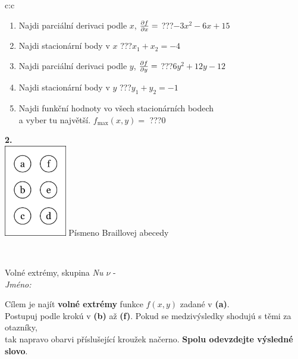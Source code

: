 \documentclass[10pt]{report}
\begin{document}
\begin{tabular}{c:c}
\begin{minipage}[c][104.5mm][t]{0.5\linewidth}
\begin{center}
\begin{minipage}{0.79\linewidth}
\begin{center}
\begin{varwidth}{\linewidth}
\begin{enumerate}
\item Najdi parciální derivaci podle $x$, $\pdv{f}{x}=$\quad \dotfill\; ???\;\dotfill \quad $-3x^2-6x+15$
\item Najdi stacionární body v $x$\quad \dotfill\; ???\;\dotfill \quad $x_1+x_2=-4$
\item Najdi parciální derivaci podle $y$, $\pdv{f}{y}=$\quad \dotfill\; ???\;\dotfill \quad $6y^2+12y-12$
\item Najdi stacionární body v $y$\quad \dotfill\; ???\;\dotfill \quad $y_1+y_2=-1$
\item Najdi funkční hodnoty vo všech stacionárních bodech \\ \phantom{xxxxxx} a vyber tu najvětší. $f_{\text{max}}(x,y)=$\quad \dotfill\; ???\;\dotfill \quad $0$
\end{enumerate}
\end{varwidth}
\end{center}
\end{minipage}
\begin{minipage}{0.20\linewidth}
\begin{center}
{\Huge\bfseries 2.} \\[2mm]
\includegraphics[height=40mm]{../images/braille.png}
{\small Písmeno Braillovej abecedy}
\end{center}
\end{minipage}
\end{center}
\end{minipage}
\\ \hdashline
\begin{minipage}[c][104.5mm][t]{0.5\linewidth}
\begin{center}
\vspace{7mm}
{\huge Volné extrémy, skupina \textit{Nu $\nu$} -}\\[5mm]
\textit{Jméno:}\phantom{xxxxxxxxxxxxxxxxxxxxxxxxxxxxxxxxxxxxxxxxxxxxxxxxxxxxxxxxxxxxxxxxx}\\[5mm]
\begin{minipage}{0.95\linewidth}
\begin{center}
Cílem je najít \textbf{volné extrémy} funkce $f(x,y)$ zadané v \textbf{(a)}.\\Postupuj podle krokú v \textbf{(b)} až \textbf{(f)}. Pokud se medzivýsledky shodujú s těmi za otazníky,\\tak napravo obarvi příslušející kroužek načerno. \textbf{Spolu odevzdejte výsledné slovo}.

\end{center}
\end{minipage}
\end{center}
\end{minipage}
\end{tabular}
\end{document}
